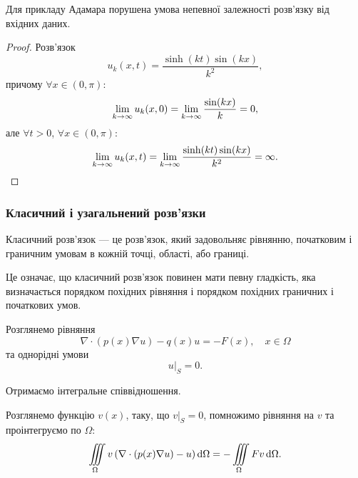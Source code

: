 \begin{proposition}
    Для прикладу Адамара порушена умова непевної залежності роз\-в'яз\-ку від вхідних даних.
\end{proposition}

\begin{proof}
    Розв'язок
    \begin{equation}
        u_k(x, t) = \frac{\sinh(k t) \sin (k x)}{k^2},
    \end{equation}
    причому $\forall x \in (0, \pi)$:
    \begin{equation}
        \displaystyle\lim\limits_{k \to \infty} u_k(x, 0) =  \displaystyle\lim\limits_{k \to \infty} \frac{\sin (k x)}{k} = 0,
    \end{equation}
    але $\forall t > 0$, $\forall x \in (0, \pi)$:
    \begin{equation}
        \displaystyle\lim\limits_{k \to \infty} u_k(x, t) =  \displaystyle\lim\limits_{k \to \infty} \frac{\sinh(k t) \sin (k x)}{k^2} = \infty.
    \end{equation}
\end{proof}

\subsubsection{Класичний і узагальнений розв'язки}

\begin{definition}
    Класичний розв'язок --- це розв'язок, який задовольняє рівнянню, початковим і граничним умовам в кожній точці, області, або границі.    
\end{definition}

Це означає, що класичний розв'язок повинен мати певну гладкість, яка визначається порядком похідних рівняння і порядком похідних граничних і початкових умов. \medskip

Розглянемо рівняння
\begin{equation}
    \label{eq:differential-equation}
    \nabla \cdot (p(x) \nabla u) - q(x) u = -F (x), \quad x \in \Omega
\end{equation}
та однорідні умови
\begin{equation}
    \label{eq:homogenuous-conditions}
    \left. u \right|_S = 0.
\end{equation}

Отримаємо інтегральне співвідношення. \medskip

Розглянемо функцію $v(x)$, таку, що $\left. v \right|_S = 0$, помножимо рівняння на $v$ та проінтегруємо по $\Omega$:
\begin{equation}
    \displaystyle\iiint\limits_\Omega v \left(\nabla \cdot (p(x) \nabla u) - u \right) \mathop{}\!\mathrm{d} \Omega = - \displaystyle\iiint\limits_\Omega F v \mathop{}\!\mathrm{d} \Omega.    
\end{equation}

